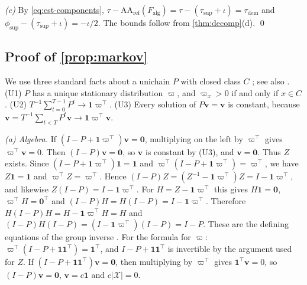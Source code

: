 \emph{(c)} By \eqref{eq:est-components}, $\tau-\mathrm{AA}_{\mathrm{ref}}(F_{\mathrm{alg}})=\tau-(\tau_{\mathrm{sup}}+\iota)=\tau_{\mathrm{dem}}$ and $\phi_{\mathrm{sup}}-(\tau_{\mathrm{sup}}+\iota)=-\iota/2$. The bounds follow from \cref{thm:decomp}(d). \qed

\subsection{Proof of \texorpdfstring{\cref{prop:markov}}{the exposure-functionals proposition}}\label{app:pf-markov}

We use three standard facts about a unichain $P$ with closed class $C$ \citep[Chs.~3--5]{kemeny1960}; see also \citet{seneta2006}. (U1) $P$ has a unique stationary distribution $\varpi$, and $\varpi_x>0$ if and only if $x\in C$. (U2) $T^{-1}\sum_{t=0}^{T-1}P^t\to\bm1\varpi^{\top}$. (U3) Every solution of $P\bm v=\bm v$ is constant, because $\bm v=T^{-1}\sum_{t<T}P^t\bm v\to\bm1\varpi^{\top}\bm v$.

\emph{(a) Algebra.} If $(I-P+\bm1\varpi^{\top})\bm v=\bm0$, multiplying on the left by $\varpi^{\top}$ gives $\varpi^{\top}\bm v=0$. Then $(I-P)\bm v=\bm0$, so $\bm v$ is constant by (U3), and $\bm v=\bm0$. Thus $Z$ exists. Since $(I-P+\bm1\varpi^{\top})\bm1=\bm1$ and $\varpi^{\top}(I-P+\bm1\varpi^{\top})=\varpi^{\top}$, we have $Z\bm1=\bm1$ and $\varpi^{\top}Z=\varpi^{\top}$. Hence $(I-P)Z=(Z^{-1}-\bm1\varpi^{\top})Z=I-\bm1\varpi^{\top}$, and likewise $Z(I-P)=I-\bm1\varpi^{\top}$. For $H=Z-\bm1\varpi^{\top}$ this gives $H\bm1=\bm0$, $\varpi^{\top}H=\bm0^{\top}$ and $(I-P)H=H(I-P)=I-\bm1\varpi^{\top}$. Therefore $H(I-P)H=H-\bm1\varpi^{\top}H=H$ and $(I-P)H(I-P)=(I-\bm1\varpi^{\top})(I-P)=I-P$. These are the defining equations of the group inverse \citep{meyer1975}. For the formula for $\varpi$: $\varpi^{\top}(I-P+\bm1\bm1^{\top})=\bm1^{\top}$, and $I-P+\bm1\bm1^{\top}$ is invertible by the argument used for $Z$. If $(I-P+\bm1\bm1^{\top})\bm v=\bm0$, then multiplying by $\varpi^{\top}$ gives $\bm1^{\top}\bm v=0$, so $(I-P)\bm v=\bm0$, $\bm v=c\bm1$ and $c|\mathcal X|=0$.

